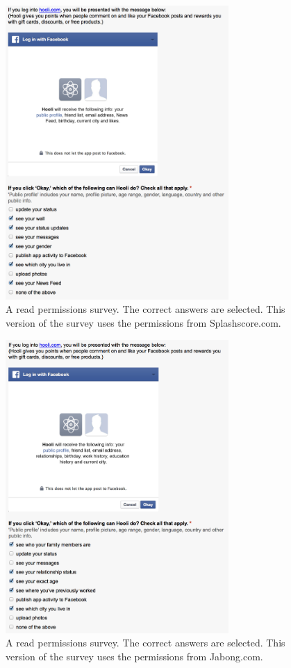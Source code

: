 \documentclass[10pt]{sig-alternate-10pt}
\begin{document}
\begin{figure}[h!]
  \centering
  \includegraphics[width=8.5cm]{62r}
  \caption{A read permissions survey. The correct answers are selected. This version of the survey uses the permissions from Splashscore.com.}
  \label{figure:62r}
\end{figure}

\begin{figure}[h!]
  \centering
  \includegraphics[width=8.5cm]{63r}
  \caption{A read permissions survey. The correct answers are selected. This version of the survey uses the permissions from Jabong.com.}
  \label{figure:63r}
\end{figure}
\end{document}
